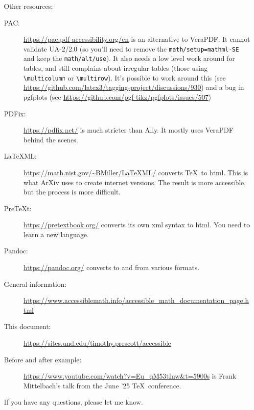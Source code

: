 \documentclass{article}
\begin{document}
Other resources:
\begin{description}
\item[PAC:] \url{https://pac.pdf-accessibility.org/en} is an alternative to VeraPDF.  It cannot validate UA-2/2.0 (so you'll need to remove the \texttt{math/setup=mathml-SE} and keep the \texttt{math/alt/use}).  It also needs a low level work around for tables, and still complains about irregular tables (those using \verb|\multicolumn| or \verb|\multirow|).  It's possible to work around this (see \url{https://github.com/latex3/tagging-project/discussions/930}) and a bug in pgfplots (see \url{https://github.com/pgf-tikz/pgfplots/issues/507})
\item[PDFix:] \url{https://pdfix.net/} is much stricter than Ally.  It mostly uses VeraPDF behind the scenes.
\item[\LaTeX ML:] \url{https://math.nist.gov/~BMiller/LaTeXML/} converts \TeX\ to html.  This is what ArXiv uses to create internet versions.  The result is more accessible, but the process is more difficult.
\item[PreTeXt:] \url{https://pretextbook.org/} converts its own xml syntax to html.  You need to learn a new language.
\item[Pandoc:] \url{https://pandoc.org/} converts to and from various formats.
\item[General information:] \url{https://www.accessiblemath.info/accessible_math_documentation_page.html}
\item[This document:] \url{https://sites.und.edu/timothy.prescott/accessible}
\item[Before and after example:] \url{https://www.youtube.com/watch?v=Eu_qM53tInw&t=5900s} is Frank Mittelbach's talk from the June '25 \TeX\ conference. 
\end{description}

If you have any questions, please let me know.
\end{document}
